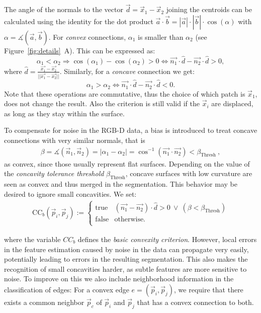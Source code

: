 The angle of the normals to the vector $\vec d = \vec x_1-\vec x_2$ joining the centroids can be calculated using the identity for the dot product $\vec a\cdot \vec b = |\vec a|\cdot |\vec b|\cdot \cos(\alpha)$ with $\alpha = \measuredangle(\vec a,\vec b)$. For \textit{convex} connections, $\alpha_1$ is smaller than $\alpha_2$ (see Figure~\ref{fig:details}~A). This can be expressed as:
  \begin{equation*}
    \alpha_1 < \alpha_2 \Rightarrow \cos(\alpha_1) - \cos(\alpha_2) > 0 \Leftrightarrow \vec {n_1}\cdot \hat d - \vec {n_2}\cdot \hat d > 0,
  \end{equation*}
where $\hat d = \frac{\vec{x_1}-\vec{x_2}}{||\vec{x_1}-\vec{x_2}||}$. Similarly, for a \textit{concave} connection we get:
  \begin{equation*}
    \alpha_1 > \alpha_2 \Leftrightarrow \vec {n_1}\cdot \hat d - \vec {n_2}\cdot \hat d < 0.
  \end{equation*}
Note that these operations are commutative, thus the choice of which patch is $\vec x_1$, does not change the result. Also the criterion is still valid if the $\vec x_i$ are displaced, as long as they stay within the surface.

To compensate for noise in the RGB-D data, a bias is introduced to treat concave connections with very similar normals, that is
\begin{align*}
  \beta = \measuredangle(\vec n_1,\vec n_2) = |\alpha_1-\alpha_2| = \cos^{-1}(\vec{n_1}\cdot \vec{n_2}) < \beta_\text{Thresh}~,
\end{align*}
as convex, since those usually represent flat surfaces. Depending on the value of the \textit{concavity tolerance threshold} $\beta_\text{Thresh}$, concave surfaces with low curvature are seen as convex and thus merged in the segmentation. This behavior may be desired to ignore small concavities. We set:
\begin{align}
  \text{CC}_b(\vec p_i, \vec p_j) :=
  \left\{\begin{array}{lc}
          \text{true} & \left(\vec {n_1} - \vec {n_2} \right) \cdot \hat d  > 0~ \lor~ (  \beta < \beta_\text{Thresh} )\\
            \text{false} & \text{otherwise.}\\
          \end{array} \right.
  \label{eqn:CC}
\end{align}

where the variable $CC_b$ defines the {\em basic convexity criterion}. However, local errors in the feature estimation caused by noise in the data can propagate very easily, potentially leading to errors in the resulting segmentation. This also makes the recognition of small concavities harder, as subtle features are more sensitive to noise. To improve on this we also include neighborhood information in the classification of edges: For a convex edge $e=(\vec p_i, \vec p_j)$, we require that there exists a common neighbor $\vec p_c$ of $\vec p_i$ and $\vec p_j$ that has a convex connection to both.

